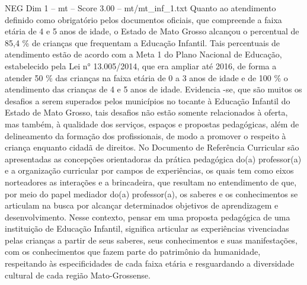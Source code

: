 \begin{textsample}{NEG Dim 1 – mt – Score 3.00 – mt/mt\_inf\_1.txt}
Quanto ao atendimento definido como obrigatório pelos documentos oficiais, que compreende a faixa etária de 4 e 5 anos de idade, o Estado de Mato Grosso alcançou o percentual de 85,4 \% de crianças que frequentam a Educação Infantil.
Tais percentuais de atendimento estão de acordo com a Meta 1 do Plano Nacional de Educação, estabelecido pela Lei n{\EmojiFont °} 13.005/2014, que era ampliar até 2016, de forma a atender 50 \% das crianças na faixa etária de 0 a 3 anos de idade e de 100 \% o atendimento das crianças de 4 e 5 anos de idade.
Evidencia -se, que são muitos os desafios a serem superados pelos municípios no tocante à Educação Infantil do Estado de Mato Grosso, tais desafios não estão somente relacionados à oferta, mas também, à qualidade dos serviços, espaços e propostas pedagógicas, além de delineamento da formação dos profissionais, de modo a promover o respeito à criança enquanto cidadã de direitos.
No Documento de Referência Curricular são apresentadas as concepções orientadoras da prática pedagógica do(a) professor(a) e a organização curricular por campos de experiências, os quais tem como eixos norteadores as interações e a brincadeira, que resultam no entendimento de que, por meio do papel mediador do(a) professor(a), os saberes e os conhecimentos se articulam na busca por alcançar determinados objetivos de aprendizagem e desenvolvimento.
Nesse contexto, pensar em uma proposta pedagógica de uma instituição de Educação Infantil, significa articular as experiências vivenciadas pelas crianças a partir de seus saberes, seus conhecimentos e suas manifestações, com os conhecimentos que fazem parte do patrimônio da humanidade, respeitando às especificidades de cada faixa etária e resguardando a diversidade cultural de cada região Mato-Grossense.

\end{textsample}
